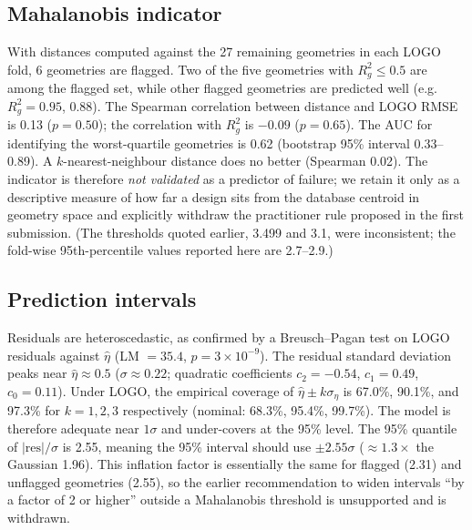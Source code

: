 \documentclass[12pt]{article}
\begin{document}
\begin{table}[!ht]\centering\caption{Reynolds-number bands and LOGO error per band.}\label{tab:re}\end{table}

\subsection{Mahalanobis indicator}
With distances computed against the 27 remaining geometries in each LOGO fold, 6 geometries are flagged. Two of the five geometries with $R^2_g \le 0.5$ are among the flagged set, while other flagged geometries are predicted well (e.g.\ $R^2_g = 0.95$, 0.88). The Spearman correlation between distance and LOGO RMSE is 0.13 ($p = 0.50$); the correlation with $R^2_g$ is $-0.09$ ($p = 0.65$). The AUC for identifying the worst-quartile geometries is 0.62 (bootstrap 95\% interval 0.33--0.89). A $k$-nearest-neighbour distance does no better (Spearman 0.02). The indicator is therefore \emph{not validated} as a predictor of failure; we retain it only as a descriptive measure of how far a design sits from the database centroid in geometry space and explicitly withdraw the practitioner rule proposed in the first submission. (The thresholds quoted earlier, 3.499 and 3.1, were inconsistent; the fold-wise 95th-percentile values reported here are 2.7--2.9.)

\subsection{Prediction intervals}
Residuals are heteroscedastic, as confirmed by a Breusch--Pagan test on LOGO residuals against $\hat\eta$ (LM $= 35.4$, $p = 3\times10^{-9}$). The residual standard deviation peaks near $\hat\eta \approx 0.5$ ($\sigma \approx 0.22$; quadratic coefficients $c_2 = -0.54$, $c_1 = 0.49$, $c_0 = 0.11$). Under LOGO, the empirical coverage of $\hat\eta \pm k\sigma_\eta$ is 67.0\%, 90.1\%, and 97.3\% for $k = 1, 2, 3$ respectively (nominal: 68.3\%, 95.4\%, 99.7\%). The model is therefore adequate near $1\sigma$ and under-covers at the 95\% level. The 95\% quantile of $|\text{res}|/\sigma$ is 2.55, meaning the 95\% interval should use $\pm 2.55\sigma$ ($\approx 1.3\times$ the Gaussian 1.96). This inflation factor is essentially the same for flagged (2.31) and unflagged geometries (2.55), so the earlier recommendation to widen intervals ``by a factor of 2 or higher'' outside a Mahalanobis threshold is unsupported and is withdrawn.
\end{document}
